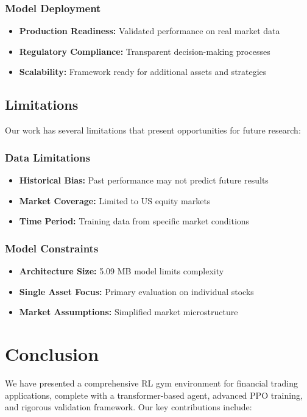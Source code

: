 \documentclass[10pt,journal]{IEEEtran}
\begin{document}
\subsubsection{Model Deployment}
\begin{itemize}
\item \textbf{Production Readiness:} Validated performance on real market data
\item \textbf{Regulatory Compliance:} Transparent decision-making processes
\item \textbf{Scalability:} Framework ready for additional assets and strategies
\end{itemize}

\subsection{Limitations}
Our work has several limitations that present opportunities for future research:

\subsubsection{Data Limitations}
\begin{itemize}
\item \textbf{Historical Bias:} Past performance may not predict future results
\item \textbf{Market Coverage:} Limited to US equity markets
\item \textbf{Time Period:} Training data from specific market conditions
\end{itemize}

\subsubsection{Model Constraints}
\begin{itemize}
\item \textbf{Architecture Size:} 5.09 MB model limits complexity
\item \textbf{Single Asset Focus:} Primary evaluation on individual stocks
\item \textbf{Market Assumptions:} Simplified market microstructure
\end{itemize}

\section{Conclusion}

We have presented a comprehensive RL gym environment for financial trading applications, complete with a transformer-based agent, advanced PPO training, and rigorous validation framework. Our key contributions include:
\end{document}
